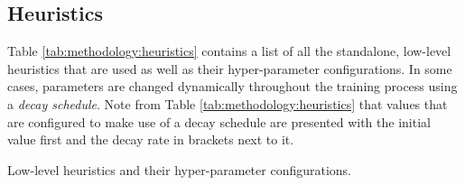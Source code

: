 \documentclass[preprint,review,12pt]{elsarticle}
\begin{document}
\subsection{Heuristics}\label{sec:methodology:heuristics}

Table \ref{tab:methodology:heuristics} contains a list of all the standalone, low-level heuristics that are used as well as their hyper-parameter configurations. In some cases, parameters are changed dynamically throughout the training process using a \textit{decay schedule}. Note from Table \ref{tab:methodology:heuristics} that values that are configured to make use of a decay schedule are presented with the initial value first and the decay rate in brackets next to it.


\begin{table}[htbp]
	\centering
	\caption{Low-level heuristics and their hyper-parameter configurations.}
	\label{tab:methodology:heuristics}%
	\par\bigskip
	\resizebox{0.6\textwidth}{!}{

}
\end{table}
\end{document}
